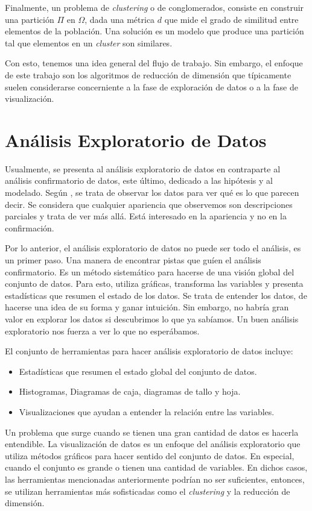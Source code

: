 \documentclass{article}
\numberwithin{equation}{section}
\theoremstyle{remark}
\theoremstyle{definition}
\theoremstyle{remark}
\theoremstyle{remark}
\begin{document}
Finalmente, un problema de \textit{clustering} o de conglomerados, 
consiste en construir una partición $\Pi$ en $\Omega$, 
dada una métrica $d$ que mide el grado de similitud entre 
elementos de la población. Una solución es un modelo que produce una partición tal que elementos
en un \textit{cluster} son similares.

Con esto, tenemos una idea general del flujo de trabajo. Sin embargo, el enfoque de este trabajo son los algoritmos de
reducción de dimensión que típicamente suelen considerarse concerniente a la fase de exploración de datos o a la fase
de visualización.  

\section{Análisis Exploratorio de Datos}
Usualmente, se presenta al análisis exploratorio de datos en contraparte al análisis confirmatorio de datos, este último, 
dedicado a las hipótesis y al modelado. Según \textcite{Tukey_1977}, se trata de observar los datos para ver qué es lo que 
parecen decir. Se considera que cualquier apariencia que observemos son descripciones parciales y trata de ver más allá. 
Está interesado en la apariencia y no en la confirmación.

Por lo anterior, el análisis exploratorio de datos no puede ser todo el análisis, es un primer paso. Una manera de encontrar pistas que guíen
el análisis confirmatorio. Es un método sistemático para hacerse de una visión global 
del conjunto de datos. Para esto, utiliza gráficas, transforma las variables y presenta estadísticas 
que resumen el estado de los datos. Se trata de entender los datos, de hacerse una idea de su forma y ganar intuición.
Sin embargo, no habría gran valor en explorar los datos si descubrimos lo que ya sabíamos. Un buen análisis exploratorio
nos fuerza a ver lo que no esperábamos.

El conjunto de herramientas para hacer análisis exploratorio de datos incluye:

\begin{itemize}
    \item Estadísticas que resumen el estado global del conjunto de datos.
    \item Histogramas, Diagramas de caja, diagramas de tallo y hoja.
    \item Visualizaciones que ayudan a entender la relación entre las variables.
\end{itemize}

Un problema que surge cuando se tienen una gran cantidad de datos es hacerla entendible. 
La visualización de datos es un enfoque del análisis exploratorio que utiliza métodos gráficos 
para hacer sentido del conjunto de datos. En especial, cuando el conjunto es grande o tienen una
cantidad de variables. En dichos casos, las herramientas mencionadas anteriormente podrían 
no ser suficientes, entonces, se utilizan herramientas más sofisticadas como el \textit{clustering} y la reducción de dimensión.
\end{document}
